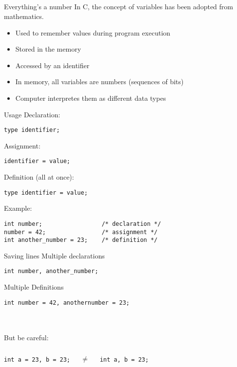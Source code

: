 \subsection{}
\begin{frame}{Everything's a number}
	In C, the concept of variables has been adopted from mathematics.
	\begin{itemize}
		\item Used to remember values during program execution
		\item Stored in the memory
		\item Accessed by an identifier
		\item In memory, all variables are numbers (sequences of bits)
		\item Computer interpretes them as different data types
	\end{itemize}
\end{frame}
\begin{frame}[fragile]{Usage}
	Declaration:
	\begin{lstlisting}[numbers=none,basicstyle=\itshape\footnotesize]
type identifier;
\end{lstlisting}
	Assignment: 
	\begin{lstlisting}[numbers=none,basicstyle=\itshape\footnotesize]
identifier = value;
\end{lstlisting}
	Definition (all at once):
	\begin{lstlisting}[numbers=none,basicstyle=\itshape\footnotesize]
type identifier = value;
\end{lstlisting}
	Example:
	\begin{lstlisting}[numbers=none]
int number;					/* declaration */
number = 42;				/* assignment */
int another_number = 23;	/* definition */

\end{lstlisting}
\end{frame}
\begin{frame}[fragile]{Saving lines}
	Multiple declarations
	\begin{lstlisting}[numbers=none]
int number, another_number;
\end{lstlisting}
	Multiple Definitions
	\begin{lstlisting}[numbers=none]
int number = 42, anothernumber = 23;
\end{lstlisting}\ \\\ \\
But be careful:
\begin{columns}[c]
	\begin{lstlisting}[numbers=none]
int a = 23, b = 23;
\end{lstlisting}
	\centering
	$\neq$
	\begin{lstlisting}[numbers=none]
int a, b = 23;
\end{lstlisting}
	
\end{columns}
\end{frame}

